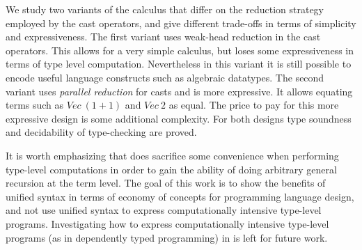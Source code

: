 We study two variants of the calculus that differ on the reduction
strategy employed by the cast operators, and give different trade-offs
in terms of simplicity and expressiveness.  The first variant \ecore uses
weak-head reduction in the cast operators.  This allows for a very
simple calculus, but loses some expressiveness in terms of type level
computation. Nevertheless in this variant it is still possible to
encode useful language constructs such as algebraic datatypes.  
The second variant \namef uses \emph{parallel
  reduction} for casts and is more expressive.
It allows equating terms such as $\mathit{Vec}~(1+1)$ and $\mathit{Vec}~2$
as equal.  The price to pay for this more expressive design is some
additional complexity. For both designs type soundness and
decidability of type-checking are proved.



\begin{comment}
To show the expressiveness and applicability of \name and the cast
operators, we develop a simple polymorphic functional language with
algebraic datatypes and some interesting type-level features. While
casts in \name do sacrifice convinience and some expressiveness to
gain the ability of doing arbitrary general recursion at the term
level, they are still powerful enough to express common features
available in traditional functional languages. These features include:
\emph{records}, \emph{higher-kinded types}, \emph{nested
  datatypes}~\cite{nesteddt}, \emph{kind polymorphism}~\cite{fc:pro},
and some \emph{simple forms of dependent types}. Casts are used to in
the implementation of records and algebraic datatypes. The additional
power of generalized casts is needed for encoding \emph{parametrized}
algebraic datatypes and records, since parametrization relies on
\emph{type abstraction}. We do not attempt to encode some non-trivial
type-level features available in modern languages like Haskell, and
also dependently typed languages. However we do present a discussion,
in Section~\ref{}, on how \name could be extended to support more expressiveness.
\end{comment}

It is worth emphasizing that \name does sacrifice some convenience
when performing type-level computations in order to gain the ability
of doing arbitrary general recursion at the term level. The goal of
this work is to show the benefits of unified syntax in terms of
economy of concepts for programming language design, and not use
unified syntax to express computationally intensive type-level
programs.  Investigating how to express computationally intensive
type-level programs (as in dependently typed programming) in \name is left for future work.


